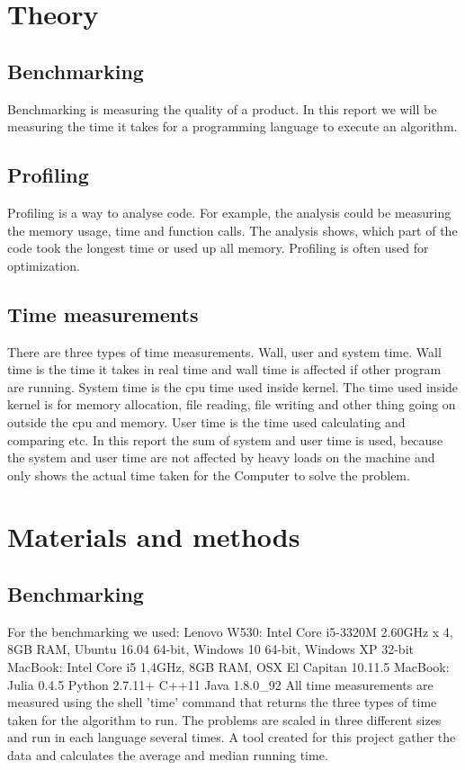 \documentclass[a4paper, 11pt, titlepage]{article}
\begin{document}
\section{Theory}
\subsection{Benchmarking}
Benchmarking is measuring the quality of a product. In this report we will be measuring the time it takes for a programming language to execute an algorithm.

\subsection{Profiling}
Profiling is a way to analyse code. For example, the analysis could be measuring the memory usage, time and function calls. The analysis shows, which part of the code took the longest time or used up all memory. Profiling is often used for optimization.

\subsection{Time measurements}
There are three types of time measurements. Wall, user and system time. Wall time is the time it takes in real time and wall time is affected if other program are running. System time is the cpu time used inside kernel. The time used inside kernel is for memory allocation, file reading, file writing and other thing going on outside the cpu and memory. User time is the time used calculating and comparing etc. In this report the sum of system and user time is used, because the system and user time are not affected by heavy loads on the machine and only shows the actual time taken for the Computer to solve the problem. 

\section{Materials and methods}
\subsection{Benchmarking}
For the benchmarking we used: 
Lenovo W530: Intel Core i5-3320M 2.60GHz x 4, 8GB RAM, Ubuntu 16.04 64-bit, Windows 10 64-bit, Windows XP 32-bit
MacBook: Intel Core i5 1,4GHz, 8GB RAM, OSX El Capitan 10.11.5
MacBook:
Julia 0.4.5
Python 2.7.11+
C++11
Java 1.8.0\_92
All time measurements are measured using the shell 'time' command that returns the three types of time taken for the algorithm to run. The problems are scaled in three different sizes and run in each language several times. A tool created for this project gather the data and calculates the average and median running time. 
\end{document}
